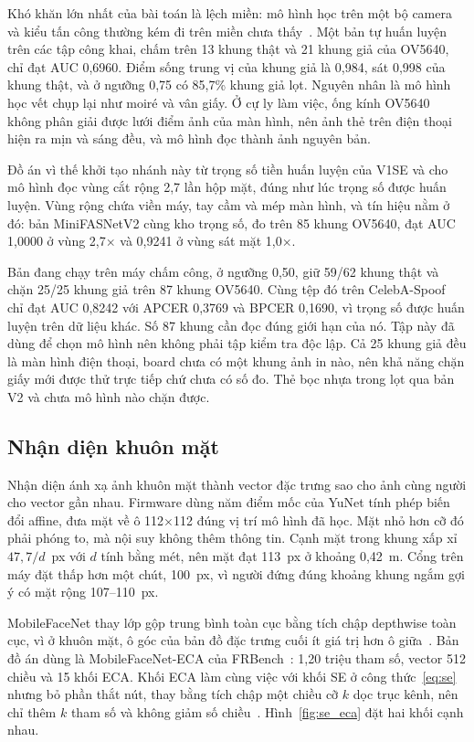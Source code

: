 \documentclass[../DoAn.tex]{subfiles}
\begin{document}
Khó khăn lớn nhất của bài toán là lệch miền: mô hình học trên một bộ camera và
kiểu tấn công thường kém đi trên miền chưa thấy~\cite{yu2023fas}. Một bản tự huấn luyện trên các tập công khai, chấm trên 13 khung thật và 21 khung giả của
OV5640, chỉ đạt AUC 0,6960. Điểm sống trung vị của khung giả là 0,984, sát
0,998 của khung thật, và ở ngưỡng 0,75 có 85,7\% khung giả lọt. Nguyên nhân là
mô hình học vết chụp lại như moiré và vân giấy. Ở cự ly làm việc, ống kính OV5640
không phân giải được lưới điểm ảnh của màn hình, nên ảnh thẻ trên điện thoại hiện
ra mịn và sáng đều, và mô hình đọc thành ảnh nguyên bản.

Đồ án vì thế khởi tạo nhánh này từ trọng số tiền huấn luyện của V1SE và cho mô hình đọc vùng
cắt rộng 2,7 lần hộp mặt, đúng như lúc trọng số được huấn luyện. Vùng rộng chứa viền máy,
tay cầm và mép màn hình, và tín hiệu nằm ở đó: bản MiniFASNetV2 cùng kho trọng số,
đo trên 85 khung OV5640, đạt AUC 1,0000 ở vùng 2,7$\times$ và 0,9241 ở vùng sát
mặt 1,0$\times$.

Bản đang chạy trên máy chấm công, ở ngưỡng 0,50, giữ 59/62 khung thật và chặn
25/25 khung giả trên 87 khung OV5640. Cùng tệp đó trên
CelebA-Spoof~\cite{celebaspoof} chỉ đạt AUC 0,8242 với APCER 0,3769 và BPCER
0,1690, vì trọng số được huấn luyện trên dữ liệu khác. Số 87 khung cần đọc đúng
giới hạn của nó. Tập này đã dùng để chọn mô hình nên không phải tập kiểm tra độc
lập. Cả 25 khung giả đều là màn hình điện thoại, board chưa có một khung ảnh in
nào, nên khả năng chặn giấy mới được thử trực tiếp chứ chưa có số đo. Thẻ bọc nhựa trong lọt qua bản V2 và chưa mô hình nào chặn được.

\subsection{Nhận diện khuôn mặt}
\label{section:2.3.3}

Nhận diện ánh xạ ảnh khuôn mặt thành vector đặc trưng sao cho ảnh cùng người cho
vector gần nhau. Firmware dùng năm điểm mốc của YuNet tính phép biến đổi affine,
đưa mặt về ô 112$\times$112 đúng vị trí mô hình đã học. Mặt nhỏ hơn cỡ đó phải phóng
to, mà nội suy không thêm thông tin. Cạnh mặt trong khung xấp xỉ $47{,}7/d$~px với
$d$ tính bằng mét, nên mặt đạt 113~px ở khoảng 0,42~m. Cổng trên máy đặt thấp hơn một
chút, 100~px, vì người đứng đúng khoảng khung ngắm gợi ý có mặt rộng 107--110~px.

MobileFaceNet thay lớp gộp trung bình toàn cục bằng tích chập depthwise toàn cục,
vì ở khuôn mặt, ô góc của bản đồ đặc trưng cuối ít giá trị hơn ô giữa~\cite{mobilefacenet2018}.
Bản đồ án dùng là MobileFaceNet-ECA của FRBench~\cite{frbench}: 1,20 triệu tham
số, vector 512 chiều và 15 khối ECA. Khối ECA làm cùng việc với khối SE ở
công thức~\eqref{eq:se} nhưng bỏ phần thắt nút, thay bằng tích chập một chiều cỡ
$k$ dọc trục kênh, nên chỉ thêm $k$ tham số và không giảm số
chiều~\cite{ecanet}. Hình~\ref{fig:se_eca} đặt hai khối cạnh nhau.
\end{document}
